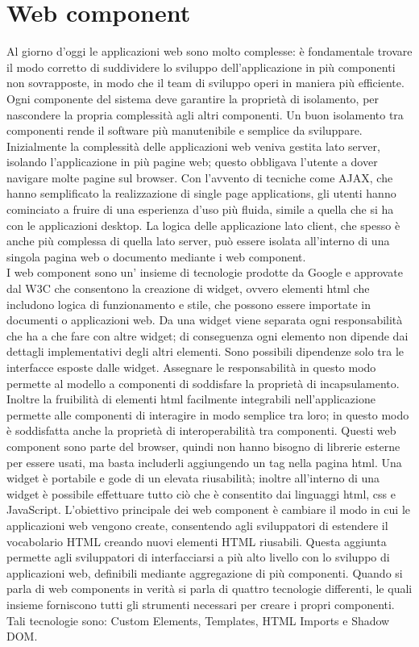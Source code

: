 \section{Web component}
\label{sec:chapter_tecnologie_abilitanti_webcomp_poly}

Al giorno d’oggi le applicazioni web sono molto complesse: è fondamentale trovare il modo corretto di suddividere lo sviluppo dell’applicazione in più componenti non sovrapposte, in modo che il team di sviluppo operi in maniera più efficiente. 
Ogni componente del sistema deve garantire la proprietà di isolamento, per nascondere la propria complessità agli altri componenti.
Un buon isolamento tra componenti rende il software più manutenibile e semplice da sviluppare.
Inizialmente la complessità delle applicazioni web veniva gestita lato server, isolando l’applicazione in più pagine web; questo obbligava l’utente a dover navigare molte pagine sul browser.
Con l’avvento di tecniche come AJAX, che hanno semplificato la realizzazione di single page applications, gli utenti hanno cominciato a fruire di una esperienza d’uso più fluida, simile a quella che si ha con le applicazioni desktop. 
La logica delle applicazione lato client, che spesso è anche più complessa di quella lato server, può essere isolata all’interno di una singola pagina web o documento mediante i web component.
\\
I web component sono un’ insieme di tecnologie prodotte da  Google e approvate dal W3C che consentono la creazione di widget, ovvero elementi html che includono logica di funzionamento e stile, che possono essere importate in documenti o applicazioni web. Da una widget viene separata ogni responsabilità che ha a che fare con altre widget; di conseguenza ogni elemento non dipende dai dettagli implementativi degli altri elementi. Sono possibili dipendenze solo tra le interfacce esposte dalle widget. 
Assegnare le responsabilità in questo modo permette al modello a componenti di soddisfare la proprietà di incapsulamento.
Inoltre la fruibilità di elementi html facilmente integrabili nell’applicazione permette alle componenti di interagire in modo semplice tra loro; in questo modo è soddisfatta anche la proprietà di interoperabilità tra componenti.
Questi web component sono parte del browser, quindi non hanno bisogno di librerie esterne per essere usati, ma basta includerli aggiungendo un tag nella pagina html. 
Una widget è portabile e gode di un elevata riusabilità; inoltre all’interno di una widget è possibile effettuare tutto ciò che è consentito dai linguaggi html, css e JavaScript. 
L’obiettivo principale dei web component è cambiare il modo in cui le applicazioni web vengono create, consentendo agli sviluppatori di estendere il vocabolario HTML creando nuovi elementi HTML riusabili. Questa aggiunta permette agli sviluppatori di interfacciarsi a più alto livello con lo sviluppo di applicazioni web, definibili mediante aggregazione di più componenti.
Quando si parla di web components in verità si parla di quattro tecnologie differenti, le quali insieme forniscono tutti gli strumenti necessari per creare i propri componenti.
Tali tecnologie sono: Custom Elements, Templates, HTML Imports e Shadow DOM. 

